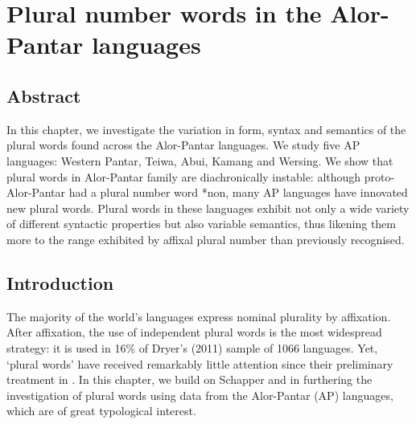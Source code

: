 
\chapter{Plural number words in the Alor-Pantar languages}
\section*{Abstract}
In this chapter, we investigate the variation in form, syntax and semantics of the plural words found across the Alor-Pantar languages. We study five AP languages: Western Pantar, Teiwa, Abui, Kamang and Wersing. We show that plural words in Alor-Pantar family are diachronically instable: although proto-Alor-Pantar had a plural number word *non, many AP languages have innovated new plural words. Plural words in these languages exhibit not only a wide variety of different syntactic properties but also variable semantics, thus likening them more to the range exhibited by affixal plural number than previously recognised.

\section{Introduction} \footnotemark{}%
\hypertarget{Toc376962648}{}
The majority of the world's languages express nominal plurality by affixation. After affixation, the use of independent plural words is the most widespread strategy: it is used in 16\% of Dryer's (2011) sample of 1066 languages.\nocite{Dryer2011} Yet, `plural words' have received remarkably little attention since their preliminary treatment in \citet{Dryer1989}. In this chapter, we build on Schapper and \citet{Klamer2011} in furthering the investigation of plural words using data from the Alor-Pantar (AP) languages, which are of great typological interest.


